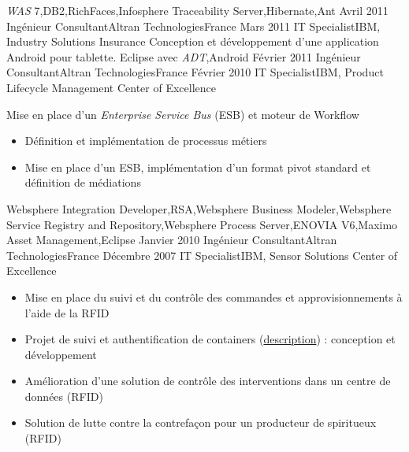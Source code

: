 \begin{experiences}
{\begin{itemize}
                      \end{itemize}
                    }
                    {\emph{WAS} 7,DB2,RichFaces,Infosphere Traceability Server,Hibernate,Ant}
  \emptySeparator
  \consultantexperience
  {Avril 2011}      {Ingénieur Consultant}{Altran Technologies}{France}
  {Mars 2011}       {IT Specialist}{IBM, Industry Solutions Insurance}
                    {
                      Conception et développement d'une application Android pour tablette. 
                    }
                    {Eclipse avec \emph{ADT},Android} 
  \emptySeparator   
  \consultantexperience
  {Février 2011}    {Ingénieur Consultant}{Altran Technologies}{France}
  {Février 2010}    {IT Specialist}{IBM, Product Lifecycle Management Center of Excellence}
                    {
                      Mise en place d'un \emph{Enterprise Service Bus} (ESB) et moteur de Workflow
                      \begin{itemize}
                        \item Définition et implémentation de processus métiers                           
                        \item Mise en place d'un ESB, implémentation d'un format pivot standard et définition de médiations
                      \end{itemize}
                    }
                    {
                      Websphere Integration Developer,RSA,Websphere Business Modeler,Websphere Service Registry and Repository,Websphere Process Server,ENOVIA V6,Maximo Asset Management,Eclipse
                    }   
  \emptySeparator            
  \consultantexperience
  {Janvier 2010}    {Ingénieur Consultant}{Altran Technologies}{France}
  {Décembre 2007}   {IT Specialist}{IBM, Sensor Solutions Center of Excellence}
                    {
                      \begin{itemize}
                        \item Mise en place du suivi et du contrôle des commandes et approvisionnements à l'aide de la RFID
                        \item Projet de suivi et authentification de containers (\href{http://www.container-centralen.co.uk/rfid/history.aspx}{description}) : conception et développement
                        \item Amélioration d'une solution de contrôle des interventions dans un centre de données (RFID)
                        \item Solution de lutte contre la contrefaçon pour un producteur de spiritueux (RFID)           

\end{itemize}}
\end{experiences}
